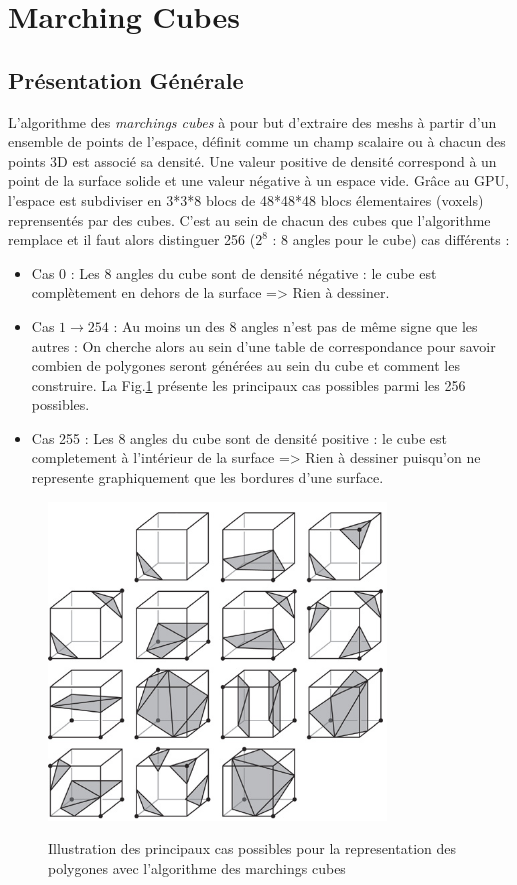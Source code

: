 \documentclass[a4paper]{article}
\begin{document}
\section{Marching Cubes}

\subsection{Présentation Générale}

L'algorithme des \textit{marchings cubes} à pour but d'extraire des meshs à partir d'un ensemble de points de l'espace, définit comme un champ scalaire ou à chacun des points 3D est associé sa densité. Une valeur positive de densité correspond à un point de la surface solide et une valeur négative à un espace vide. Grâce au GPU, l'espace est subdiviser en 3*3*8 blocs de 48*48*48 blocs élementaires (voxels) reprensentés par des cubes. C'est au sein de chacun des cubes que l'algorithme remplace et il faut alors distinguer 256 ($2^8$ : 8 angles pour le cube) cas différents : 
\begin{itemize}
\item Cas 0 : Les 8 angles du cube sont de densité négative : le cube est complètement en dehors de la surface => Rien à dessiner.
\item Cas $ 1 \to 254$ : Au moins un des 8 angles n'est pas de même signe que les autres : On cherche alors au sein d'une table de correspondance pour savoir combien de polygones seront générées au sein du cube et comment les construire. La Fig.\ref{marchingCubes} présente les principaux cas possibles parmi les 256 possibles. 
\item Cas 255 : Les 8 angles du cube sont de densité positive : le cube est completement à l'intérieur de la surface => Rien à dessiner puisqu'on ne represente graphiquement que les bordures d'une surface. 

\end{itemize}

\begin{figure}[H]
\centering
\includegraphics[width=0.8\textwidth]{figures/marchingCubes.png}
\label{marchingCubes}
\caption{Illustration des principaux cas possibles pour la representation des polygones avec l'algorithme des marchings cubes}
\end{figure}
\end{document}

